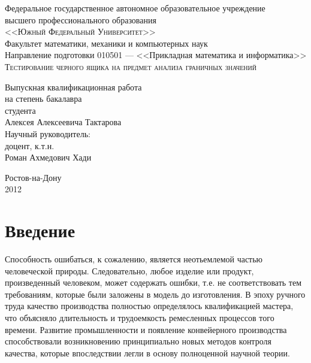 \documentclass[a4paper,14pt,href]{article}
\begin{document}
\thispagestyle{empty}
\begin{center}
Федеральное государственное автономное образовательное учреждение \\
высшего профессионального образования \\
\textsc{<<Южный Федеральный Университет>>}\\[1.0cm]

Факультет математики, механики и компьютерных наук\\[1.0cm]

Направление подготовки 010501 --- <<Прикладная математика и информатика>>\\[3cm]

\textsc{Тестирование черного ящика на предмет анализа граничных значений}\\[3cm]

\begin{flushright}
   	Выпускная квалификационная работа \\
   	на степень бакалавра \\
   	студента \\
   	Алексея Алексеевича Тактарова \\[1.0cm]

   	Научный руководитель: \\
	доцент, к.т.н. \\
	Роман Ахмедович Хади
\end{flushright}

\vfill

	Ростов-на-Дону\\
	2012
\end{center}

\newpage
\tableofcontents

\newpage
\section*{Введение}

  Способность ошибаться, к сожалению, является неотьемлемой частью человеческой природы. Следовательно, любое изделие или продукт, произведенный человеком, может содержать ошибки, т.е. не соответствовать тем требованиям, которые были заложены в модель до изготовления. В эпоху ручного труда качество производства полностью определялось квалификацией мастера, что объясняло длительность и трудоемкость ремесленных процессов того времени. Развитие промышленности и появление конвейерного производства способствовали возникновению принципиально новых методов контроля качества, которые впоследствии легли в основу полноценной научной теории\cite{Ishikawa}.
\end{document}
